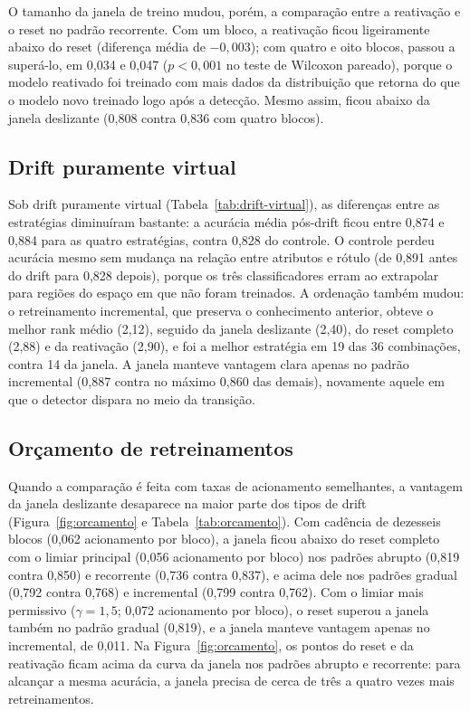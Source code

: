 O tamanho da janela de treino mudou, porém, a comparação entre a reativação
e o reset no padrão recorrente. Com um bloco, a reativação ficou ligeiramente
abaixo do reset (diferença média de $-0{,}003$); com quatro e oito blocos,
passou a superá-lo, em 0,034 e 0,047 ($p < 0{,}001$ no teste de Wilcoxon
pareado), porque o modelo reativado foi treinado com mais dados da
distribuição que retorna do que o modelo novo treinado logo após a
detecção. Mesmo assim, ficou abaixo da janela deslizante (0,808 contra 0,836
com quatro blocos).

\subsection{Drift puramente virtual}

Sob drift puramente virtual (Tabela~\ref{tab:drift-virtual}), as diferenças
entre as estratégias diminuíram bastante: a acurácia média pós-drift ficou
entre 0,874 e 0,884 para as quatro estratégias, contra 0,828 do controle. O
controle perdeu acurácia mesmo sem mudança na relação entre atributos e
rótulo (de 0,891 antes do drift para 0,828 depois), porque os três
classificadores erram ao extrapolar para regiões do espaço em que não foram
treinados. A ordenação também mudou: o retreinamento incremental, que
preserva o conhecimento anterior, obteve o melhor rank médio (2,12), seguido
da janela deslizante (2,40), do reset completo (2,88) e da reativação
(2,90), e foi a melhor estratégia em 19 das 36 combinações, contra 14 da
janela. A janela manteve vantagem clara apenas no padrão incremental (0,887
contra no máximo 0,860 das demais), novamente aquele em que o detector
dispara no meio da transição.



\subsection{Orçamento de retreinamentos}

Quando a comparação é feita com taxas de acionamento semelhantes, a vantagem
da janela deslizante desaparece na maior parte dos tipos de drift
(Figura~\ref{fig:orcamento} e Tabela~\ref{tab:orcamento}). Com cadência de
dezesseis blocos (0,062 acionamento por bloco), a janela ficou abaixo do
reset completo com o limiar principal (0,056 acionamento por bloco) nos
padrões abrupto (0,819 contra 0,850) e recorrente (0,736 contra 0,837), e
acima dele nos padrões gradual (0,792 contra 0,768) e incremental (0,799
contra 0,762). Com o limiar mais permissivo ($\gamma = 1{,}5$; 0,072
acionamento por bloco), o reset superou a janela também no padrão gradual
(0,819), e a janela manteve vantagem apenas no incremental, de 0,011. Na
Figura~\ref{fig:orcamento}, os pontos do reset e da reativação ficam acima
da curva da janela nos padrões abrupto e recorrente: para alcançar a mesma
acurácia, a janela precisa de cerca de três a quatro vezes mais
retreinamentos.

